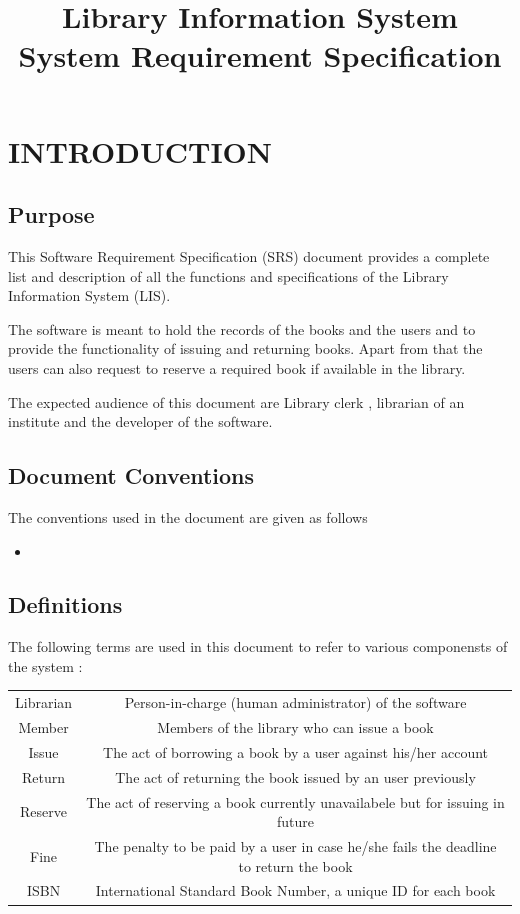 \documentclass{article}
\title{Library Information System\\ System Requirement Specification}
\author{}
\begin{document}
\maketitle
\tableofcontents


\section{INTRODUCTION}

\subsection{Purpose}
This Software Requirement Specification (SRS) document provides a complete list and description of all the functions and specifications of the Library Information System (LIS).

The software is meant to hold the records of the books and the users and to provide the functionality of issuing and returning books. Apart from that the users can also request to reserve a required book if available in the library.

The expected audience of this document are Library clerk , librarian of an institute and the developer of the software.

\subsection{Document Conventions}
The conventions used in the document are given as follows
\begin{itemize}
\item 
\end{itemize}

\subsection{Definitions}
The following terms are used in this document to refer to various componensts of the system :\\

\begin{tabular}{ c| c }
 Librarian & Person-in-charge (human administrator) of the software\\
 Member & Members of the library who can issue a book\\
 Issue & The act of borrowing a book by a user against his/her account\\
 Return & The act of returning the book issued by an user previously \\
 Reserve & The act of reserving a book currently unavailabele but for issuing in future\\
 Fine & The penalty to be paid by a user in case he/she fails the deadline to return the book\\
 ISBN & International Standard Book Number, a unique ID for each book
\end{tabular}	
\end{document}
